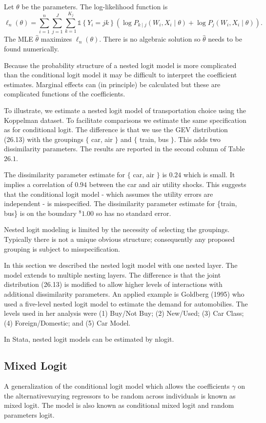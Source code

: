 \documentclass[10pt]{article}
\begin{document}
Let $\theta$ be the parameters. The log-likelihood function is
$$
\ell_{n}(\theta)=\sum_{i=1}^{n} \sum_{j=1}^{J} \sum_{k=1}^{K_{j}} \mathbb{1}\left\{Y_{i}=j k\right\}\left(\log P_{k \mid j}\left(W_{i}, X_{i} \mid \theta\right)+\log P_{j}\left(W_{i}, X_{i} \mid \theta\right)\right) .
$$
The MLE $\widehat{\theta}$ maximizes $\ell_{n}(\theta)$. There is no algebraic solution so $\widehat{\theta}$ needs to be found numerically.

Because the probability structure of a nested logit model is more complicated than the conditional logit model it may be difficult to interpret the coefficient estimates. Marginal effects can (in principle) be calculated but these are complicated functions of the coefficients.

To illustrate, we estimate a nested logit model of transportation choice using the Koppelman dataset. To facilitate comparisons we estimate the same specification as for conditional logit. The difference is that we use the GEV distribution (26.13) with the groupings $\{$ car, air $\}$ and $\{$ train, bus $\}$. This adds two dissimilarity parameters. The results are reported in the second column of Table $26.1$.

The dissimilarity parameter estimate for $\{$ car, air $\}$ is $0.24$ which is small. It implies a correlation of $0.94$ between the car and air utility shocks. This suggests that the conditional logit model - which assumes the utility errors are independent - is misspecified. The dissimilarity parameter estimate for \{train, bus\} is on the boundary ${ }^{8} 1.00$ so has no standard error.

Nested logit modeling is limited by the necessity of selecting the groupings. Typically there is not a unique obvious structure; consequently any proposed grouping is subject to misspecification.

In this section we described the nested logit model with one nested layer. The model extends to multiple nesting layers. The difference is that the joint distribution (26.13) is modified to allow higher levels of interactions with additional dissimilarity parameters. An applied example is Goldberg (1995) who used a five-level nested logit model to estimate the demand for automobilies. The levels used in her analysis were (1) Buy/Not Buy; (2) New/Used; (3) Car Class; (4) Foreign/Domestic; and (5) Car Model.

In Stata, nested logit models can be estimated by nlogit.

\subsection{Mixed Logit}
A generalization of the conditional logit model which allows the coefficients $\gamma$ on the alternativevarying regressors to be random across individuals is known as mixed logit. The model is also known as conditional mixed logit and random parameters logit.
\end{document}
